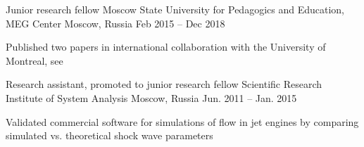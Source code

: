 \begin{cventries}
{\begin{cvitems}
      \end{cvitems}
    }
  \cventry
    {Junior research fellow}
    {Moscow State University for Pedagogics and Education, MEG Center}
    {Moscow, Russia}
    {Feb 2015 -- Dec 2018}
    {
      \begin{cvitems}
      \item{Published two papers in international collaboration with the University of Montreal, see \cite{Alamian2017a, Alamian2017b}}
      \end{cvitems}
    }
  \cventry
    {Research assistant, promoted to junior research fellow}
    {Scientific Research Institute of System Analysis}
    {Moscow, Russia}
    {Jun. 2011 -- Jan. 2015}
    {
      \begin{cvitems}
        \item{Validated commercial software for simulations of flow in jet engines by comparing simulated vs. theoretical shock wave parameters}
      \end{cvitems}
    }
\end{cventries}
